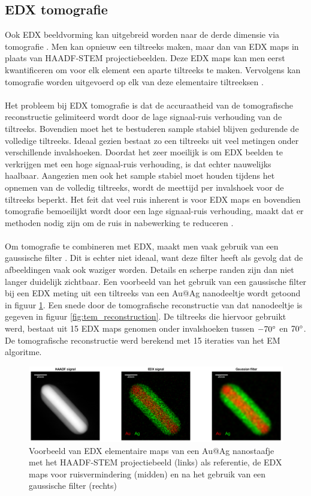\documentclass{report}
\begin{document}
\subsection{EDX tomografie}
Ook EDX beeldvorming kan uitgebreid worden naar de derde dimensie via tomografie \cite{thesis:sanctorum, thesis:zanaga, paper:edxprocessing}. Men kan opnieuw een tiltreeks maken, maar dan van EDX maps in plaats van HAADF-STEM projectiebeelden. Deze EDX maps kan men eerst kwantificeren om voor elk element een aparte tiltreeks te maken. Vervolgens kan tomografie worden uitgevoerd op elk van deze elementaire tiltreeksen \cite{thesis:zanaga}.
\\ \\
Het probleem bij EDX tomografie is dat de accuraatheid van de tomografische reconstructie gelimiteerd wordt door de lage signaal-ruis verhouding van de tiltreeks. Bovendien moet het te bestuderen sample stabiel blijven gedurende de volledige tiltreeks. Ideaal gezien bestaat zo een tiltreeks uit veel metingen onder verschillende invalshoeken. Doordat het zeer moeilijk is om EDX beelden te verkrijgen met een hoge signaal-ruis verhouding, is dat echter nauwelijks haalbaar. Aangezien men ook het sample stabiel moet houden tijdens het opnemen van de volledig tiltreeks, wordt de meettijd per invalshoek voor de tiltreeks beperkt. Het feit dat veel ruis inherent is voor EDX maps en bovendien tomografie bemoeilijkt wordt door een lage signaal-ruis verhouding, maakt dat er methoden nodig zijn om de ruis in nabewerking te reduceren \cite{paper:edxprocessing}.
\\ \\
Om tomografie te combineren met EDX, maakt men vaak gebruik van een gaussische filter \cite{paper:edxprocessing}. Dit is echter niet ideaal, want deze filter heeft als gevolg dat de afbeeldingen vaak ook waziger worden. Details en scherpe randen zijn dan niet langer duidelijk zichtbaar. Een voorbeeld van het gebruik van een gaussische filter bij een EDX meting uit een tiltreeks van een Au@Ag nanodeeltje wordt getoond in figuur \ref{fig:tem_edx_gauss}. Een snede door de tomografische reconstructie van dat nanodeeltje is gegeven in figuur \ref{fig:tem_reconstruction}. De tiltreeks die hiervoor gebruikt werd, bestaat uit 15 EDX maps genomen onder invalshoeken tussen $-70\degree$ en $70\degree$. De tomografische reconstructie werd berekend met 15 iteraties van het EM algoritme.
\begin{figure}[h!]
	\centering
	\includegraphics[width=15cm]{images/tem/edx_gauss.png}
	\caption{Voorbeeld van EDX elementaire maps van een Au@Ag nanostaafje met het HAADF-STEM projectiebeeld (links) als referentie, de EDX maps voor ruisvermindering (midden) en na het gebruik van een gaussische filter (rechts)}
	\label{fig:tem_edx_gauss}
\end{figure}
\end{document}
